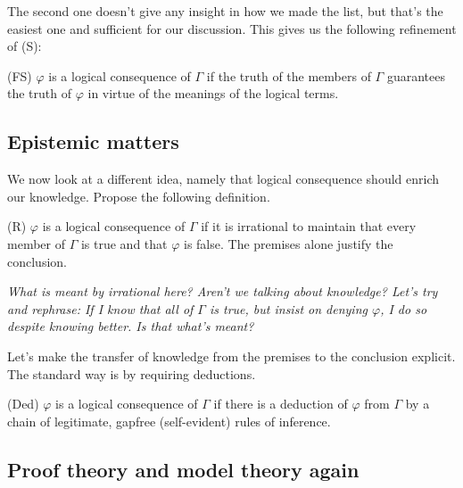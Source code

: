 \documentclass[a4paper]{article}
\begin{document}
The second one doesn't give any insight in how we made the list, but that's
the easiest one and sufficient for our discussion.  This gives us the following
refinement of (S):

(FS) $\varphi$ is a logical consequence of $\Gamma$ if the truth of the members
of $\Gamma$ guarantees the truth of $\varphi$ in virtue of the meanings of the
logical terms.

\subsection{Epistemic matters}

We now look at a different idea, namely that logical consequence should enrich
our knowledge.  Propose the following definition.

(R) $\varphi$ is a logical consequence of $\Gamma$ if it is irrational to
maintain that every member of $\Gamma$ is true and that $\varphi$ is false.  The
premises alone justify the conclusion.

\emph{What is meant by irrational here?  Aren't we talking about knowledge?
Let's try and rephrase:  If I know that all of $\Gamma$ is true, but insist on
denying $\varphi$, I do so despite knowing better.  Is that what's meant?}

Let's make the transfer of knowledge from the premises to the conclusion
explicit.  The standard way is by requiring deductions.

(Ded) $\varphi$ is a logical consequence of $\Gamma$ if there is a deduction of
$\varphi$ from $\Gamma$ by a chain of legitimate, gapfree (self-evident) rules
of inference.

\subsection{Proof theory and model theory again}




\end{document}
